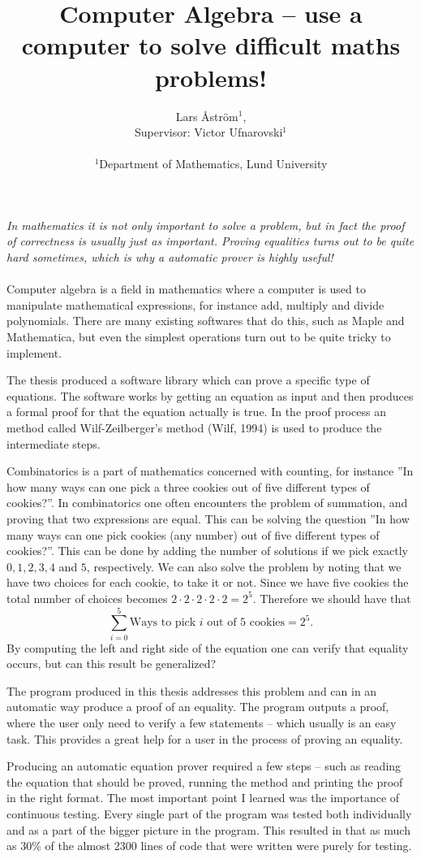 \documentclass[letterpaper]{article}
\title{Computer Algebra -- use a computer to solve difficult maths problems!}
\author{Lars Åström$^{1}$, \\ Supervisor: Victor Ufnarovski$^{1}$\\
\mbox{}\\
$^1$Department of Mathematics, Lund University
}
\begin{document}
\maketitle
\Large
\textit{
In mathematics it is not only important to solve a problem, but in fact the proof of correctness is usually just as important. Proving equalities turns out to be quite hard sometimes, which is why a automatic prover is highly useful!
}
\\ \\
\normalsize
Computer algebra is a field in mathematics where a computer is used to manipulate mathematical expressions, for instance add, multiply and divide polynomials. There are many existing softwares that do this, such as Maple and Mathematica, but even the simplest operations turn out to be quite tricky to implement.

The thesis produced a software library which can prove a specific type of equations. The software works by getting an equation as input and then produces a formal proof for that the equation actually is true. In the proof process an method called Wilf-Zeilberger's method (Wilf, 1994) is used to produce the intermediate steps.

Combinatorics is a part of mathematics concerned with counting, for instance ''In how many ways can one pick a three cookies out of five different types of cookies?''. In combinatorics one often encounters the problem of summation, and proving that two expressions are equal. This can be solving the question ''In how many ways can one pick cookies (any number) out of five different types of cookies?''. This can be done by adding the number of solutions if we pick exactly $0,1,2,3,4$ and $5$, respectively. We can also solve the problem by noting that we have two choices for each cookie, to take it or not. Since we have five cookies the total number of choices becomes $2\cdot 2\cdot 2\cdot 2\cdot 2=2^5$. Therefore we should have that $$\sum_{i=0}^5 \text{Ways to pick } i \text{ out of 5 cookies}=2^5.$$ By computing the left and right side of the equation one can verify that equality occurs, but can this result be generalized?

The program produced in this thesis addresses this problem and can in an automatic way produce a proof of an equality. The program outputs a proof, where the user only need to verify a few statements -- which usually is an easy task. This provides a great help for a user in the process of proving an equality.

Producing an automatic equation prover required a few steps -- such as reading the equation that should be proved, running the method and printing the proof in the right format. The most important point I learned was the importance of continuous testing. Every single part of the program was tested both individually and as a part of the bigger picture in the program. This resulted in that as much as 30\% of the almost 2300 lines of code that were written were purely for testing.
\end{document}
